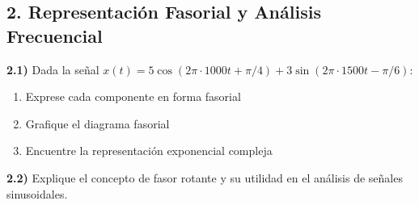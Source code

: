 \subsection*{2. Representación Fasorial y Análisis Frecuencial}

\textbf{2.1)} Dada la señal \( x(t) = 5\cos(2\pi \cdot 1000t + \pi/4) + 3\sin(2\pi \cdot 1500t - \pi/6) \):
\begin{enumerate}
    \item Exprese cada componente en forma fasorial
    \item Grafique el diagrama fasorial
    \item Encuentre la representación exponencial compleja
\end{enumerate}

\textbf{2.2)} Explique el concepto de fasor rotante y su utilidad en el análisis de señales sinusoidales.
